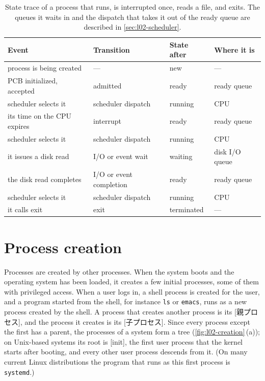 \documentclass[../main.tex]{subfiles}
\begin{document}
\begin{table}[htbp]
  \centering
  \small
  \caption{State trace of a process that runs, is interrupted once, reads a
    file, and exits.  The queues it waits in and the dispatch that takes it
    out of the ready queue are described in \cref{sec:l02-scheduler}.}
  \label{tab:l02-trace}
  \begin{tabular}{@{}llll@{}}
    \toprule
    Event & Transition & State after & Where it is \\
    \midrule
    process is being created     & ---                     & new        & --- \\
    PCB initialized, accepted    & admitted                & ready      & ready queue \\
    scheduler selects it         & scheduler dispatch      & running    & CPU \\
    its time on the CPU expires  & interrupt               & ready      & ready queue \\
    scheduler selects it         & scheduler dispatch      & running    & CPU \\
    it issues a disk read        & I/O or event wait       & waiting    & disk I/O queue \\
    the disk read completes      & I/O or event completion & ready      & ready queue \\
    scheduler selects it         & scheduler dispatch      & running    & CPU \\
    it calls exit                & exit                    & terminated & --- \\
    \bottomrule
  \end{tabular}
\end{table}

\section{Process creation}
\label{sec:l02-creation}

Processes are created by other processes.  When the system boots
and the operating system has been loaded, it creates a few initial
processes, some of them with privileged access.  When a user logs in, a
shell process is created for the user, and a program started from the
shell, for instance \texttt{ls} or \texttt{emacs}, runs as a new process
created by the shell.  A process that creates another process is its
[親プロセス], and the process it creates is its
[子プロセス].  Since every process except the first
has a parent, the processes of a system form a tree
(\cref{fig:l02-creation}\,(a)); on Unix-based systems its root is
[init], the first user process that the kernel
starts after booting, and every other user process descends from it.  (On
many current Linux distributions the program that runs as this first
process is \texttt{systemd}.)
\end{document}
